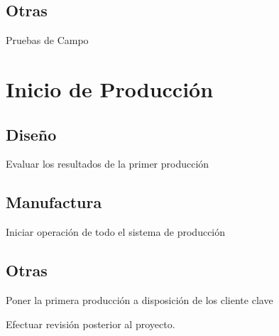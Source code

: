 {\subsection {Otras}
Pruebas de Campo \par

\section {Inicio de Producción}
\subsection {Diseño}
Evaluar los resultados de la primer producción \par
\subsection {Manufactura}
Iniciar operación de todo el sistema de producción \par
\subsection {Otras}
Poner la primera producción a disposición de los cliente clave \par
Efectuar revisión posterior al proyecto. \par
}




